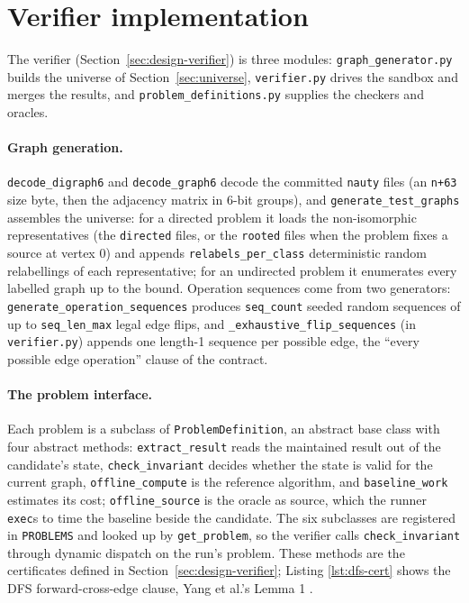 \section{Verifier implementation}
\label{sec:impl-verifier}

The verifier (Section~\ref{sec:design-verifier}) is three modules:
\texttt{graph\_generator.py} builds the universe of Section~\ref{sec:universe},
\texttt{verifier.py} drives the sandbox and merges the results, and
\texttt{problem\_definitions.py} supplies the checkers and oracles.

\paragraph{Graph generation.} \texttt{decode\_digraph6} and
\texttt{decode\_graph6} decode the committed \texttt{nauty} files (an
\texttt{n+63} size byte, then the adjacency matrix in 6-bit groups), and
\texttt{generate\_test\_graphs} assembles the universe:
for a directed problem it loads the non-isomorphic representatives (the
\texttt{directed} files, or the \texttt{rooted} files when the problem fixes a
source at vertex 0) and appends \texttt{relabels\_per\_class} deterministic
random relabellings of each representative; for an undirected problem it
enumerates every labelled graph up to the bound. Operation sequences come from
two generators: \texttt{generate\_operation\_sequences} produces
\texttt{seq\_count} seeded random sequences of up to \texttt{seq\_len\_max}
legal edge flips, and \texttt{\_exhaustive\_flip\_sequences} (in
\texttt{verifier.py}) appends one length-1 sequence per possible edge, the
``every possible edge operation'' clause of the contract.

  \paragraph{The problem interface.} Each problem is a subclass of
\texttt{ProblemDefinition}, an abstract base class with four abstract methods:
\texttt{extract\_result} reads the maintained result out of the candidate's
state, \texttt{check\_invariant} decides whether the state is valid for the
current graph, \texttt{offline\_compute} is the reference algorithm, and
\texttt{baseline\_work} estimates its cost; \texttt{offline\_source} is the
oracle as source, which the runner \texttt{exec}s to time the baseline beside the
candidate. The six subclasses are registered in \texttt{PROBLEMS} and looked up
by \texttt{get\_problem}, so the verifier calls \texttt{check\_invariant}
through dynamic dispatch on the run's problem. These methods are the
certificates defined in Section~\ref{sec:design-verifier}; Listing
\ref{lst:dfs-cert} shows the DFS forward-cross-edge clause, Yang et al.'s
Lemma 1 \citep{yang2019dynamic}.

